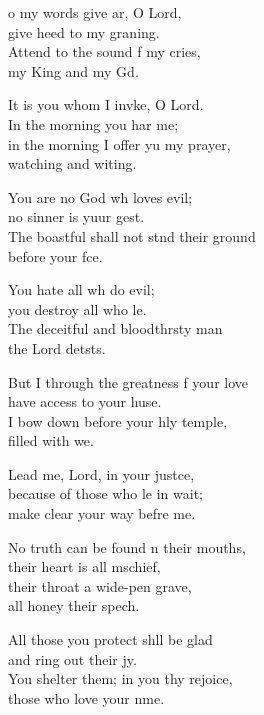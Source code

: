 \begin{psalmverse}
  \begin{patverse}
    o my words give ar, O Lord,\Med\\
    give heed to my graning.\\
    Attend to the sound f my cries,\Med\\
    my King and my Gd.

It is you whom I invke, O Lord.\Med\\
    In the morning you har me;\\
in the morning I offer yu my prayer,\Med\\
    watching and witing.

You are no God wh loves evil;\Med\\
    no sinner is yuur gest.\\
The boastful shall not stnd their ground\Med\\
    before your fce.

You hate all wh do evil;\Med\\
    you destroy all who l\pointup{\i}e.\\
The deceitful and bloodth\pointup{\i}rsty man\Med\\
    the Lord detsts.

But I through the greatness f your love\Med\\
    have access to your huse.\\
I bow down before your hly temple,\Med\\
    filled with we.

Lead me, Lord, in your just\pointup{\i}ce,\Flex\\
    because of those who l\pointup{\i}e in wait;\Med\\
    make clear your way befre me.

No truth can be found \pointup{\i}n their mouths,\Med\\
    their heart is all m\pointup{\i}schief,\\
their throat a wide-pen grave,\Med\\
    all honey their spech.

All those you protect shll be glad\Med\\
    and ring out their jy.\\
You shelter them; in you thy rejoice,\Med\\
    those who love your nme.


\end{patverse}
\end{psalmverse}
